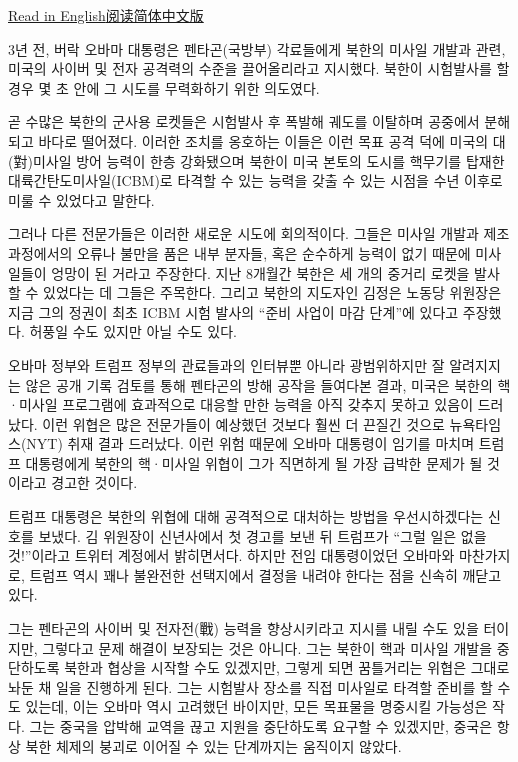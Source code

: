 \href{https://www.nytimes.com/2017/03/04/world/asia/north-korea-missile-program-sabotage.html}{Read
in
English}\href{http://cn.nytimes.com/usa/20170304/north-korea-missile-program-sabotage/}{阅读简体中文版}

3년 전, 버락 오바마 대통령은 펜타곤(국방부) 각료들에게 북한의 미사일
개발과 관련, 미국의 사이버 및 전자 공격력의 수준을 끌어올리라고
지시했다. 북한이 시험발사를 할 경우 몇 초 안에 그 시도를 무력화하기 위한
의도였다.

곧 수많은 북한의 군사용 로켓들은 시험발사 후 폭발해 궤도를 이탈하며
공중에서 분해되고 바다로 떨어졌다. 이러한 조치를 옹호하는 이들은 이런
목표 공격 덕에 미국의 대(對)미사일 방어 능력이 한층 강화됐으며 북한이
미국 본토의 도시를 핵무기를 탑재한 대륙간탄도미사일(ICBM)로 타격할 수
있는 능력을 갖출 수 있는 시점을 수년 이후로 미룰 수 있었다고 말한다.

그러나 다른 전문가들은 이러한 새로운 시도에 회의적이다. 그들은 미사일
개발과 제조 과정에서의 오류나 불만을 품은 내부 분자들, 혹은 순수하게
능력이 없기 때문에 미사일들이 엉망이 된 거라고 주장한다. 지난 8개월간
북한은 세 개의 중거리 로켓을 발사할 수 있었다는 데 그들은 주목한다.
그리고 북한의 지도자인 김정은 노동당 위원장은 지금 그의 정권이 최초 ICBM
시험 발사의 ``준비 사업이 마감 단계''에 있다고 주장했다. 허풍일 수도
있지만 아닐 수도 있다.

오바마 정부와 트럼프 정부의 관료들과의 인터뷰뿐 아니라 광범위하지만 잘
알려지지는 않은 공개 기록 검토를 통해 펜타곤의 방해 공작을 들여다본
결과, 미국은 북한의 핵·미사일 프로그램에 효과적으로 대응할 만한 능력을
아직 갖추지 못하고 있음이 드러났다. 이런 위협은 많은 전문가들이 예상했던
것보다 훨씬 더 끈질긴 것으로 뉴욕타임스(NYT) 취재 결과 드러났다. 이런
위험 때문에 오바마 대통령이 임기를 마치며 트럼프 대통령에게 북한의
핵·미사일 위협이 그가 직면하게 될 가장 급박한 문제가 될 것이라고 경고한
것이다.

트럼프 대통령은 북한의 위협에 대해 공격적으로 대처하는 방법을
우선시하겠다는 신호를 보냈다. 김 위원장이 신년사에서 첫 경고를 보낸 뒤
트럼프가 ``그럴 일은 없을 것!''이라고 트위터 계정에서 밝히면서다. 하지만
전임 대통령이었던 오바마와 마찬가지로, 트럼프 역시 꽤나 불완전한
선택지에서 결정을 내려야 한다는 점을 신속히 깨닫고 있다.

그는 펜타곤의 사이버 및 전자전(戰) 능력을 향상시키라고 지시를 내릴 수도
있을 터이지만, 그렇다고 문제 해결이 보장되는 것은 아니다. 그는 북한이
핵과 미사일 개발을 중단하도록 북한과 협상을 시작할 수도 있겠지만, 그렇게
되면 꿈틀거리는 위협은 그대로 놔둔 채 일을 진행하게 된다. 그는 시험발사
장소를 직접 미사일로 타격할 준비를 할 수도 있는데, 이는 오바마 역시
고려했던 바이지만, 모든 목표물을 명중시킬 가능성은 작다. 그는 중국을
압박해 교역을 끊고 지원을 중단하도록 요구할 수 있겠지만, 중국은 항상
북한 체제의 붕괴로 이어질 수 있는 단계까지는 움직이지 않았다.

